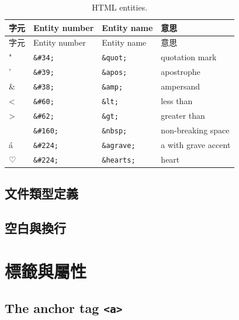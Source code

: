 \documentclass[
]{book}
\theoremstyle{definition}
\theoremstyle{remark}
\begin{document}
\begin{longtable}[]{@{}
  >{\raggedright\arraybackslash}p{}
  >{\raggedright\arraybackslash}p{}
  >{\raggedright\arraybackslash}p{}
  >{\raggedright\arraybackslash}p{}@{}}
\caption{\label{tab:htmlentities} HTML entities.}\tabularnewline
\toprule
字元 & Entity number & Entity name & 意思 \\
\midrule
\endfirsthead
\toprule
字元 & Entity number & Entity name & 意思 \\
\midrule
\endhead
" & \texttt{\&\#34;} & \texttt{\&quot;} & quotation mark \\
' & \texttt{\&\#39;} & \texttt{\&apos;} & apostrophe \\
\& & \texttt{\&\#38;} & \texttt{\&amp;} & ampersand \\
\textless{} & \texttt{\&\#60;} & \texttt{\&lt;} & less than \\
\textgreater{} & \texttt{\&\#62;} & \texttt{\&gt;} & greater than \\
& \texttt{\&\#160;} & \texttt{\&nbsp;} & non-breaking space \\
á & \texttt{\&\#224;} & \texttt{\&agrave;} & a with grave accent \\
♡ & \texttt{\&\#224;} & \texttt{\&hearts;} & heart \\
\bottomrule
\end{longtable}

\hypertarget{ux6587ux4ef6ux985eux578bux5b9aux7fa9}{%
\subsection{文件類型定義}\label{ux6587ux4ef6ux985eux578bux5b9aux7fa9}}

\hypertarget{ux7a7aux767dux8207ux63dbux884c}{%
\subsection{空白與換行}\label{ux7a7aux767dux8207ux63dbux884c}}

\hypertarget{tagsattri}{%
\section{標籤與屬性}\label{tagsattri}}

\hypertarget{the-anchor-tag-a}{%
\subsection{\texorpdfstring{The anchor tag \texttt{\textless{}a\textgreater{}}}{The anchor tag \textless a\textgreater{}}}\label{the-anchor-tag-a}}
\end{document}
